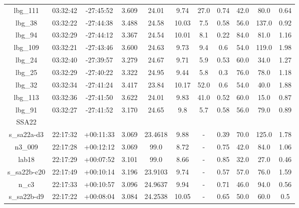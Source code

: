 \documentclass[fleqn,usenatbib]{mn2e}
\begin{document}
\begin{table*}
\begin{threeparttable}
\begin{tabular}{ccccccccccc}
lbg\_111        & 03:32:42 & -27:45:52 & 3.609       & 24.01  & 9.74  & 27.0 & 0.74        & 42.0        & 80.0    & 0.64      \\
lbg\_38         & 03:32:22 & -27:44:38 & 3.488       & 24.58  & 10.03 & 7.5  & 0.58        & 56.0        & 137.0   & 0.92      \\
lbg\_94         & 03:32:29 & -27:44:12 & 3.367       & 24.54  & 10.01 & 8.1  & 0.22        & 84.0        & 81.0    & 1.16      \\
lbg\_109        & 03:32:21 & -27:43:46 & 3.600       & 24.63  & 9.73  & 9.4  & 0.6         & 54.0        & 119.0   & 1.98      \\
lbg\_24         & 03:32:40 & -27:39:57 & 3.279       & 24.67  & 9.71  & 5.9  & 0.53        & 60.0        & 34.0    & 1.27      \\
lbg\_25         & 03:32:29 & -27:40:22 & 3.322        & 24.95  & 9.44  & 5.8  & 0.3         & 76.0        & 78.0    & 1.18      \\
lbg\_32         & 03:32:34 & -27:41:24 & 3.417      & 23.84  & 10.17 & 52.0 & 0.6         & 54.0        & 40.0    & 1.88      \\
lbg\_113        & 03:32:36 & -27:41:50 & 3.622      & 24.01  & 9.83  & 41.0 & 0.52        & 60.0        & 15.0    & 0.87      \\
lbg\_91         & 03:32:27 & -27:41:52 & 3.170       & 24.65  & 9.8   & 5.7  & 0.58        & 56.0        & 79.0    & 0.89 \\
 \hline
 SSA22 & & & & & & & & & & \\
 \hline
s\_sa22a-d3   & 22:17:32 & +00:11:33 & 3.069 & 23.4618 & 9.88  & -            & 0.39        & 70.0        & 125.0   & 1.78      \\
n3\_009       & 22:17:28 & +00:12:12 & 3.069 & 99.0    & 8.72  & -            & 0.75        & 42.0        & 84.0    & 1.06      \\
lab18         & 22:17:29 & +00:07:52 & 3.101           & 99.0    & 8.66  & -            & 0.85        & 32.0        & 27.0    & 0.46      \\
s\_sa22b-c20  & 22:17:49 & +00:10:14 & 3.196     & 23.9103 & 9.74  & -            & 0.57        & 57.0        & 76.0    & 1.59      \\
n\_c3         & 22:17:33 & +00:10:57 & 3.096       & 24.9637 & 9.94  & -            & 0.71        & 46.0        & 94.0    & 0.56      \\
s\_sa22b-d9   & 22:17:22 & +00:08:04 & 3.084    & 24.2538 & 10.05 & -            & 0.65        & 50.0        & 60.0    & 0.5       \\

\end{tabular}
\end{threeparttable}
\end{table*}
\end{document}

